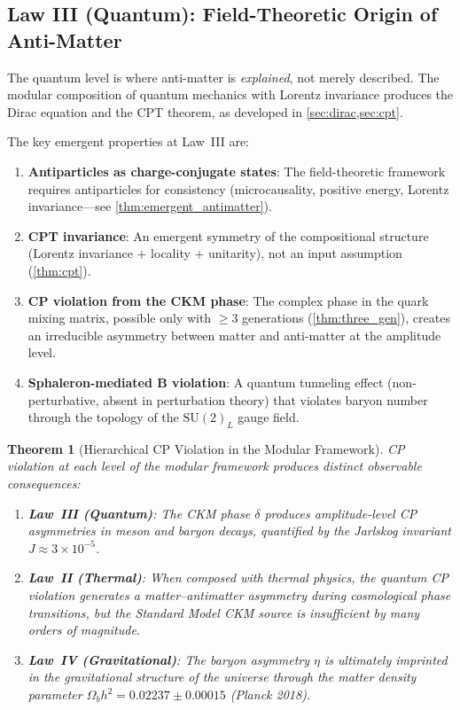 \documentclass[12pt]{article}
\newtheorem{theorem}{Theorem}[section]
\theoremstyle{definition}
\theoremstyle{remark}
\begin{document}
\subsection{Law III (Quantum): Field-Theoretic Origin of Anti-Matter}

The quantum level is where anti-matter is \emph{explained}, not merely described.
The modular composition of quantum mechanics with Lorentz invariance produces the
Dirac equation and the CPT theorem, as developed in \cref{sec:dirac,sec:cpt}.

The key emergent properties at Law~III are:
\begin{enumerate}
    \item \textbf{Antiparticles as charge-conjugate states}: The field-theoretic
    framework requires antiparticles for consistency (microcausality, positive energy,
    Lorentz invariance---see \cref{thm:emergent_antimatter}).

    \item \textbf{CPT invariance}: An emergent symmetry of the compositional
    structure (Lorentz invariance + locality + unitarity), not an input assumption
    (\cref{thm:cpt}).

    \item \textbf{CP violation from the CKM phase}: The complex phase in the quark
    mixing matrix, possible only with $\geq 3$ generations (\cref{thm:three_gen}),
    creates an irreducible asymmetry between matter and anti-matter at the amplitude
    level.

    \item \textbf{Sphaleron-mediated B violation}: A quantum tunneling effect
    (non-perturbative, absent in perturbation theory) that violates baryon number
    through the topology of the $\text{SU}(2)_L$ gauge field.
\end{enumerate}

\begin{theorem}[Hierarchical CP Violation in the Modular Framework]
\label{thm:hierarchical_cp}
CP violation at each level of the modular framework produces distinct observable
consequences:
\begin{enumerate}
    \item \textbf{Law~III (Quantum)}: The CKM phase $\delta$ produces amplitude-level
    CP asymmetries in meson and baryon decays, quantified by the Jarlskog invariant
    $J \approx 3 \times 10^{-5}$.

    \item \textbf{Law~II (Thermal)}: When composed with thermal physics, the quantum
    CP violation generates a matter--antimatter asymmetry during cosmological phase
    transitions, but the Standard Model CKM source is insufficient by many orders
    of magnitude.

    \item \textbf{Law~IV (Gravitational)}: The baryon asymmetry $\eta$ is ultimately
    imprinted in the gravitational structure of the universe through the matter
    density parameter $\Omega_b h^2 = 0.02237 \pm 0.00015$ (Planck 2018).
\end{enumerate}
\end{theorem}
\end{document}

